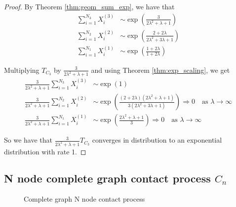 \documentclass{article}
\theoremstyle{plain}
\theoremstyle{definition}
\theoremstyle{remark}
\numberwithin{equation}{section}
\begin{document}
\begin{proof}
By Theorem \eqref{thm:geom_sum_exp}, we have that
\begin{align*}
    \sum_{i = 1}^{N_3} X_i^{(3)} &\sim \exp\left(
        \frac{3}{2\lambda^2 + \lambda + 1}
        \right) \\
    \sum_{i = 1}^{N_2} X_i^{(2)} &\sim \exp\left(
        \frac{2 + 2\lambda}{2 \lambda^2 + 3\lambda + 1}
    \right)\\
    \sum_{i = 1}^{N_1} X_i^{(1)} &\sim \exp\left(\frac{1 + 2\lambda}{1 + 2\lambda}\right)
\end{align*}

Multiplying $T_{C_3}$ by $\frac{3}{2 \lambda^2 + \lambda + 1}$ and using Theorem \eqref{thm:exp_scaling}, we get
\begin{align*}
    \frac{3}{2 \lambda^2 + \lambda + 1} \sum_{i = 1}^{N_3} X_i^{(3)} &\sim \exp\left(
        1
        \right)\\
    \frac{3}{2 \lambda^2 + \lambda + 1} \sum_{i = 1}^{N_2} X_i^{(2)} &\sim \exp\left(
        \frac{(2 + 2\lambda)(2 \lambda^2 + \lambda + 1)}{3 (2 \lambda^2 + 3\lambda + 1)}
    \right)  \Rightarrow 0 \quad \text{as } \lambda \to \infty\\
    \frac{3}{2 \lambda^2 + \lambda + 1} \sum_{i = 1}^{N_1} X_i^{(1)} &\sim \exp\left(
    \frac{2 \lambda^2 + \lambda + 1}{3}
    \right) \Rightarrow 0 \quad \text{as } \lambda \to \infty
\end{align*}

So we have that $\frac{3}{2 \lambda^2 + \lambda + 1} T_{C_3}$ converges in distribution to an exponential distribution with rate 1.
\end{proof}

\subsection{N node complete graph contact process \texorpdfstring{$C_n$}{Cn}}

\begin{figure}[h]
    \centering
    \caption{Complete graph N node contact process}
    \label{fig:n_nodes_contact}
\end{figure}
\end{document}
